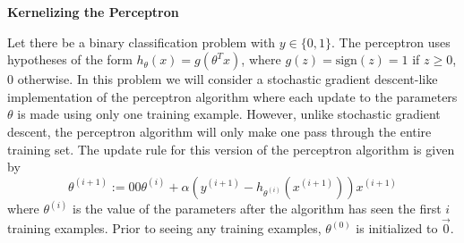 \item {\bf Kernelizing the Perceptron}

Let there be a binary classification problem with $y \in \{0, 1\}$.  The
perceptron uses hypotheses of the form $h_\theta(x) = g(\theta^T x)$, where
$g(z) = \text{sign}(z) = 1$ if $z \ge 0$, $0$ otherwise.  In this problem we
will consider a stochastic gradient descent-like implementation of the
perceptron algorithm where each update to the parameters $\theta$ is made using
only one training example.  However, unlike stochastic gradient descent, the
perceptron algorithm will only make one pass through the entire training set.
The update rule for this version of the perceptron algorithm is given by
\begin{equation*}
  \theta^{(i+1)} :=00
	  \theta^{(i)} + \alpha (y^{(i+1)} - h_{\theta^{(i)}}(x^{(i+1)})) x^{(i+1)}
\end{equation*}
where $\theta^{(i)}$ is the value of the parameters after the algorithm has
seen the first $i$ training examples. Prior to seeing any training examples,
$\theta^{(0)}$ is initialized to $\vec{0}$.

\begin{enumerate}
  

  

  
\end{enumerate}
